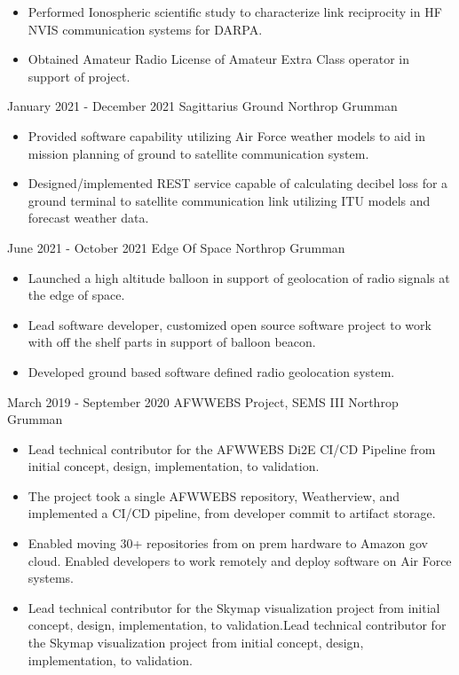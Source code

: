 \documentclass[]{src/friggeri-cv}
\begin{document}
\begin{entrylist}
{\begin{itemize}
        \item Performed Ionospheric scientific study to characterize link reciprocity in HF NVIS communication systems for DARPA.
        \item Obtained Amateur Radio License of Amateur Extra Class operator in support of project.
    \end{itemize}}
  \entry
    {January 2021 - December 2021}
    {Sagittarius Ground}
    {Northrop Grumman}
    {\begin{itemize}
        \item Provided software capability utilizing Air Force weather models to aid in mission planning of ground to satellite communication system.
        \item Designed/implemented REST service capable of calculating decibel loss for a ground terminal to satellite communication link utilizing ITU models and forecast weather data.
    \end{itemize}}
  \entry
    {June 2021 - October 2021}
    {Edge Of Space}
    {Northrop Grumman}
    {\begin{itemize}
        \item Launched a high altitude balloon in support of geolocation of radio signals at the edge of space.
        \item Lead software developer, customized open source software project to work with off the shelf parts in support of balloon beacon.
        \item Developed ground based software defined radio geolocation system.
    \end{itemize}}
  \entry
    {March 2019 - September 2020}
    {AFWWEBS Project, SEMS III}
    {Northrop Grumman}
    {\begin{itemize}
        \item Lead technical contributor for the AFWWEBS Di2E CI/CD Pipeline from initial concept, design, implementation, to validation.
        \item The project took a single AFWWEBS repository, Weatherview, and implemented a CI/CD pipeline, from developer commit to artifact storage.
        \item Enabled moving 30+ repositories from on prem hardware to Amazon gov cloud. Enabled developers to work remotely and deploy software on Air Force systems.
        \item Lead technical contributor for the Skymap visualization project from initial concept, design, implementation, to validation.Lead technical contributor for the Skymap visualization project from initial concept, design, implementation, to validation.

\end{itemize}}
\end{entrylist}
\end{document}
